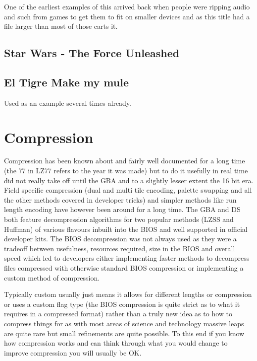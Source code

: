 \documentclass[
]{book}
\begin{document}
One of the earliest examples of this arrived back when people were ripping audio and such from games to get them to fit on smaller devices and as this title had a file larger than most of those carts it.

\hypertarget{star-wars---the-force-unleashed}{%
\subsection{Star Wars - The Force Unleashed}\label{star-wars---the-force-unleashed}}

\hypertarget{el-tigre-make-my-mule}{%
\subsection{El Tigre Make my mule}\label{el-tigre-make-my-mule}}

Used as an example several times already.

\hypertarget{compression-2}{%
\section{Compression}\label{compression-2}}

Compression has been known about and fairly well documented for a long time (the 77 in LZ77 refers to the year it was made) but to do it usefully in real time did not really take off until the GBA and to a slightly lesser extent the 16 bit era. Field specific compression (dual and multi tile encoding, palette swapping and all the other methods covered in developer tricks) and simpler methods like run length encoding have however been around for a long time. The GBA and DS both feature decompression algorithms for two popular methods (LZSS and Huffman) of various flavours inbuilt into the BIOS and well supported in official developer kits. The BIOS decompression was not always used as they were a tradeoff between usefulness, resources required, size in the BIOS and overall speed which led to developers either implementing faster methods to decompress files compressed with otherwise standard BIOS compression or implementing a custom method of compression.

Typically custom usually just means it allows for different lengths or compression or uses a custom flag type (the BIOS compression is quite strict as to what it requires in a compressed format) rather than a truly new idea as to how to compress things for as with most areas of science and technology massive leaps are quite rare but small refinements are quite possible. To this end if you know how compression works and can think through what you would change to improve compression you will usually be OK.
\end{document}
